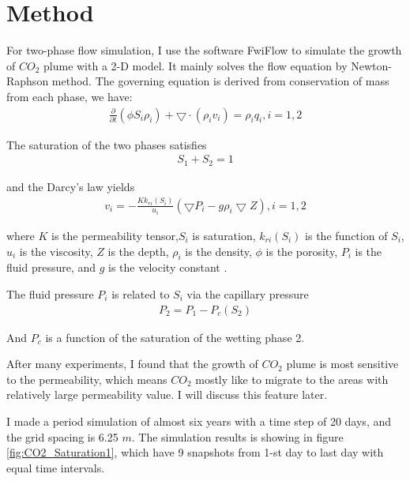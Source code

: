 \section{Method}

For two-phase flow simulation, I use the software FwiFlow \citep{li2020coupled} to simulate the growth of 
$CO_2$ plume with a 2-D model. It mainly solves the flow equation by Newton-Raphson method.
The governing equation is derived from conservation of mass from each phase, we have:
\begin{align}
    \frac{\partial}{\partial t} (\phi S_i \rho_i) + \bigtriangledown \cdot (\rho_i v_i) = \rho_i q_i,   i=1,2
    \label{equ:flow1}
\end{align}


The saturation of the two phases satisfies
\begin{align}
    S_1 + S_2 = 1
    \label{equ:flow2}
\end{align}


and the Darcy's law yields
\begin{align}
    v_i = - \frac{K k_{ri}(S_i)}{u_i} (\bigtriangledown P_i - g \rho_i \bigtriangledown Z), i=1,2
    \label{equ:flow3}
\end{align}

where $K$ is the permeability tensor,$S_i$ is saturation, $k_{ri}(S_i)$ is the function of $S_i$,
$u_i$ is the viscosity, $Z$ is the depth, $\rho_i$ is the density, $\phi$ is the porosity,
$P_i$ is the fluid pressure, and $g$ is the velocity constant \citep{li2020coupled}.


The fluid pressure $P_i$ is related to $S_i$ via the capillary pressure
\begin{align}
    P_2 = P_1 - P_c(S_2)
    \label{equ:flow4}
\end{align}

And $P_c$ is a function of the saturation of the wetting phase 2.

After many experiments, I found that the growth of $CO_2$ plume is most sensitive to the permeability,
which means $CO_2$ mostly like to migrate to the areas with relatively large permeability value.
I will discuss this feature later.

I made a period simulation of almost six years with a time step of 20 days,
and the grid spacing is 6.25 $m$. The simulation results is showing in figure \ref{fig:CO2_Saturation1},
which have 9 snapshots from 1-st day to last day with equal time intervals.

